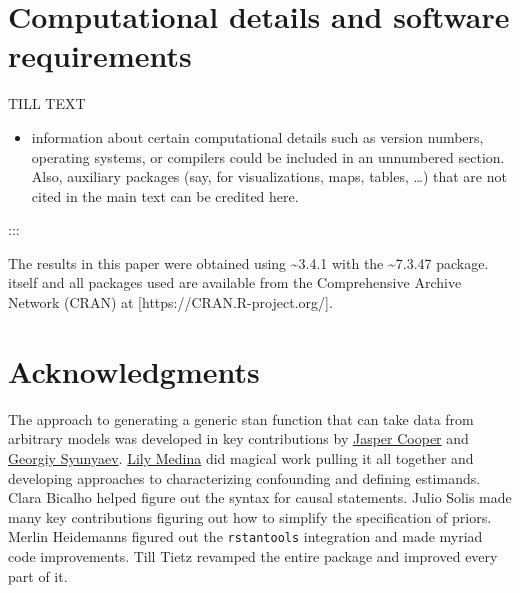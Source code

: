 \documentclass[
  article]{jss}
\providecommand{\tightlist}{%
  \setlength{\itemsep}{0pt}\setlength{\parskip}{0pt}}\usepackage{longtable,booktabs,array}
\begin{document}
\hypertarget{computational-details-and-software-requirements}{%
\section*{Computational details and software
requirements}\label{computational-details-and-software-requirements}}

TILL TEXT

\begin{itemize}
\tightlist
\item
  information about certain computational details such as version
  numbers, operating systems, or compilers could be included in an
  unnumbered section. Also, auxiliary packages (say, for visualizations,
  maps, tables, \ldots) that are not cited in the main text can be
  credited here.
\end{itemize}

:::

The results in this paper were obtained using
\textasciitilde3.4.1 with the
\textasciitilde7.3.47 package.  itself and all
packages used are available from the Comprehensive  Archive
Network (CRAN) at {[}https://CRAN.R-project.org/{]}.

\hypertarget{acknowledgments}{%
\section*{Acknowledgments}\label{acknowledgments}}

\begin{tcolorbox}[enhanced jigsaw, colback=white, breakable, arc=.35mm, leftrule=.75mm, rightrule=.15mm, opacityback=0, bottomrule=.15mm, toprule=.15mm, left=2mm]

The approach to generating a generic stan function that can take data
from arbitrary models was developed in key contributions by
\href{http://jasper-cooper.com/}{Jasper Cooper} and
\href{http://gsyunyaev.com/}{Georgiy Syunyaev}.
\href{https://lilymedina.github.io/}{Lily Medina} did magical work
pulling it all together and developing approaches to characterizing
confounding and defining estimands. Clara Bicalho helped figure out the
syntax for causal statements. Julio Solis made many key contributions
figuring out how to simplify the specification of priors. Merlin
Heidemanns figured out the \texttt{rstantools} integration and made
myriad code improvements. Till Tietz revamped the entire package and
improved every part of it.

\end{tcolorbox}
\end{document}
